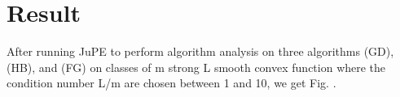 \chapter{Result}

After running JuPE to perform algorithm analysis on three algorithms (GD), (HB), and (FG) on classes of m strong L smooth convex function where the condition number L/m are chosen between 1 and 10, we get Fig. .
